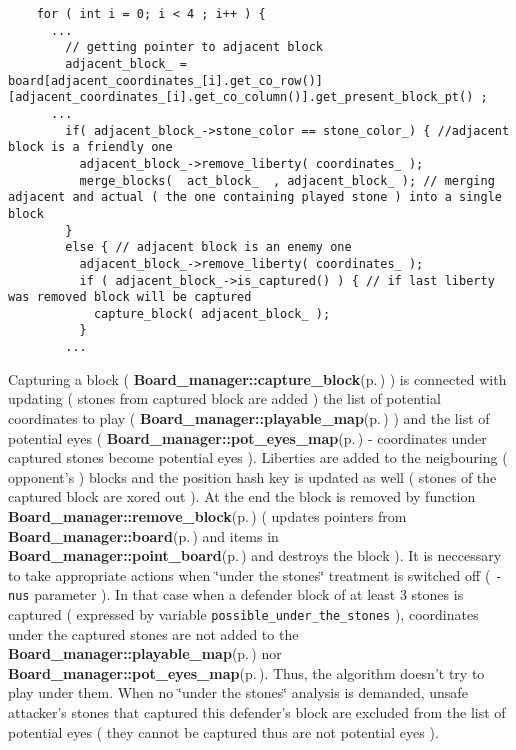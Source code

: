 \footnotesize\begin{verbatim}    for ( int i = 0; i < 4 ; i++ ) {
      ...
        // getting pointer to adjacent block 
        adjacent_block_ =  board[adjacent_coordinates_[i].get_co_row()][adjacent_coordinates_[i].get_co_column()].get_present_block_pt() ; 
      ... 
        if( adjacent_block_->stone_color == stone_color_) { //adjacent block is a friendly one 
          adjacent_block_->remove_liberty( coordinates_ );
          merge_blocks(  act_block_  , adjacent_block_ ); // merging adjacent and actual ( the one containing played stone ) into a single block
        }
        else { // adjacent block is an enemy one 
          adjacent_block_->remove_liberty( coordinates_ ); 
          if ( adjacent_block_->is_captured() ) { // if last liberty was removed block will be captured 
            capture_block( adjacent_block_ );
          }
        ...
\end{verbatim}
\normalsize


Capturing a block ( {\bf Board\_\-manager::capture\_\-block}{\rm (p.\,\pageref{classBoard__manager_a2})} ) is connected with updating ( stones from captured block are added ) the list of potential coordinates to play ( {\bf Board\_\-manager::playable\_\-map}{\rm (p.\,\pageref{classBoard__manager_r2})} ) and the list of potential eyes ( {\bf Board\_\-manager::pot\_\-eyes\_\-map}{\rm (p.\,\pageref{classBoard__manager_o0})} - coordinates under captured stones become potential eyes ). Liberties are added to the neigbouring ( opponent's ) blocks and the position hash key is updated as well ( stones of the captured block are xored out ). At the end the block is removed by function {\bf Board\_\-manager::remove\_\-block}{\rm (p.\,\pageref{classBoard__manager_a3})} ( updates pointers from {\bf Board\_\-manager::board}{\rm (p.\,\pageref{classBoard__manager_r1})} and items in {\bf Board\_\-manager::point\_\-board}{\rm (p.\,\pageref{classBoard__manager_o5})} and destroys the block ). It is neccessary to take appropriate actions when \char`\"{}under the stones\char`\"{} treatment is switched off ( {\tt -nus} parameter ). In that case when a defender block of at least 3 stones is captured ( expressed by variable {\tt possible\_\-under\_\-the\_\-stones} ), coordinates under the captured stones are not added to the {\bf Board\_\-manager::playable\_\-map}{\rm (p.\,\pageref{classBoard__manager_r2})} nor {\bf Board\_\-manager::pot\_\-eyes\_\-map}{\rm (p.\,\pageref{classBoard__manager_o0})}. Thus, the algorithm doesn't try to play under them. When no \char`\"{}under the stones\char`\"{} analysis is demanded, unsafe attacker's stones that captured this defender's block are excluded from the list of potential eyes ( they cannot be captured thus are not potential eyes ).



